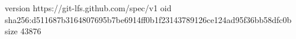 version https://git-lfs.github.com/spec/v1
oid sha256:d511687b3164807695b7be6914ff0b1f23143789126ce124ad95f36bb58dfc0b
size 43876

